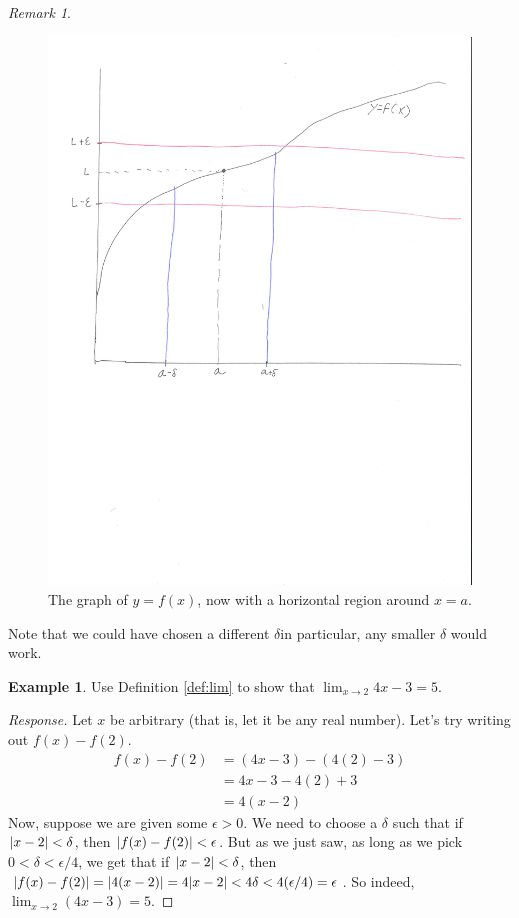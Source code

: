 \documentclass[english]{article}
\DeclarePairedDelimiter\abs{\lvert}{\rvert}%
\theoremstyle{remark}
\newtheorem{remark}{Remark}[theorem]
\theoremstyle{definition}
\newtheorem{exle}[theorem]{Example}
\newcommand{\dlim}{\displaystyle\lim}
\begin{document}
\begin{remark}
\begin{figure}[h!]\centering
	\includegraphics[scale=0.5,trim={0 4in 10mm 0},clip]{1graph3} \caption{The graph of $y=f(x)$, now with a horizontal region around $x=a$.\label{fig:1graph3}}
\end{figure}

Note that we could have chosen a different $\delta$\textemdash in particular, any smaller $\delta$ would work.
\end{remark}
\begin{exle}
	Use Definition \ref{def:lim} to show that $\displaystyle\lim_{x\to 2} 4x-3=5$.
\end{exle}
\begin{proof}[Response]
	 Let $x$ be arbitrary (that is, let it be any real number). Let's try writing out $f(x)-f(2)$.
	 \begin{align*}
	 	f(x)-f(2)&=(4x-3)-(4(2)-3)\\
	 	&=4x-3-4(2)+3\\
	 	&=4(x-2)
	 \end{align*}
 Now, suppose we are given some $\epsilon>0$. We need to choose a $\delta$ such that if $\abs{x-2}<\delta$, then $\abs{f(x)-f(2)}<\epsilon$. But as we just saw, as long as we pick $0<\delta<\epsilon/4$, we get that if $\abs{x-2}<\delta$, then $\abs{f(x)-f(2)}=\abs{4(x-2)}=4\abs{x-2}<4\delta<4(\epsilon/4)=\epsilon$. So indeed, $\dlim_{x\to 2}(4x-3)=5$. 
\end{proof}
\end{document}
